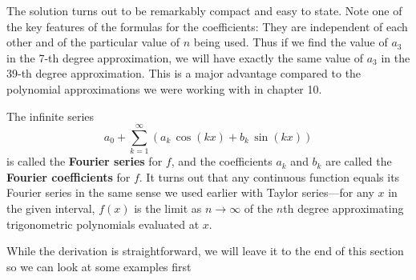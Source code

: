 {{{{The solution turns out to be remarkably compact and easy to state. Note one of the key features of the 
formulas for the coefficients: They are independent of each other and of the particular value of $n$ being used.  Thus if we find the value of $a_3$ in the 7-th degree approximation, we will have exactly the same value of $a_3$ in the 39-th degree approximation.  This is a major advantage compared to the polynomial approximations we were working with in chapter 10.

\noindent
\begin{center}\label{fourforms}
\end{center}

The infinite series
\[
a_0+\sum_{k=1}^{\infty} \left(a_k\,\cos(kx)+b_k\,\sin(kx)\right)
\]
is called the {\bf Fourier series} for $f$, and the coefficients $a_k$ and $b_k$ are called the {\bf Fourier coefficients} for $f$.  It turns out that any continuous function equals its Fourier series in the same sense we used earlier with Taylor series---for any $x$ in the given interval, $f(x)$ is the limit as $n\rightarrow\infty$ of the $n$th degree approximating trigonometric polynomials evaluated at $x$.

While the derivation is straightforward, we will leave it to the end of this section so we can look at some examples first



}}}}
